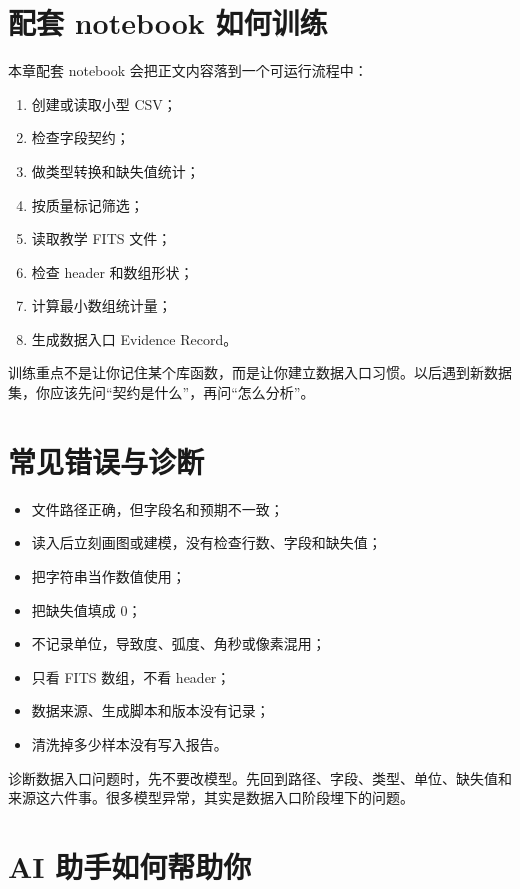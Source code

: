 \section{配套 notebook 如何训练}

本章配套 notebook 会把正文内容落到一个可运行流程中：

\begin{enumerate}
    \item 创建或读取小型 CSV；
    \item 检查字段契约；
    \item 做类型转换和缺失值统计；
    \item 按质量标记筛选；
    \item 读取教学 FITS 文件；
    \item 检查 header 和数组形状；
    \item 计算最小数组统计量；
    \item 生成数据入口 Evidence Record。
\end{enumerate}

训练重点不是让你记住某个库函数，而是让你建立数据入口习惯。以后遇到新数据集，你应该先问“契约是什么”，再问“怎么分析”。

\section{常见错误与诊断}

\begin{warnbox}[数据 I/O 中的典型问题]
\begin{itemize}
    \item 文件路径正确，但字段名和预期不一致；
    \item 读入后立刻画图或建模，没有检查行数、字段和缺失值；
    \item 把字符串当作数值使用；
    \item 把缺失值填成 0；
    \item 不记录单位，导致度、弧度、角秒或像素混用；
    \item 只看 FITS 数组，不看 header；
    \item 数据来源、生成脚本和版本没有记录；
    \item 清洗掉多少样本没有写入报告。
\end{itemize}
\end{warnbox}

诊断数据入口问题时，先不要改模型。先回到路径、字段、类型、单位、缺失值和来源这六件事。很多模型异常，其实是数据入口阶段埋下的问题。

\section{AI 助手如何帮助你}

